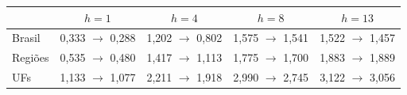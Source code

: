 \begin{tabular}{lcccc}
\toprule
 & $h=1$ & $h=4$ & $h=8$ & $h=13$ \\
\midrule
Brasil & 0,333 $\to$ 0,288 & 1,202 $\to$ 0,802 & 1,575 $\to$ 1,541 & 1,522 $\to$ 1,457 \\
Regiões & 0,535 $\to$ 0,480 & 1,417 $\to$ 1,113 & 1,775 $\to$ 1,700 & 1,883 $\to$ 1,889 \\
UFs & 1,133 $\to$ 1,077 & 2,211 $\to$ 1,918 & 2,990 $\to$ 2,745 & 3,122 $\to$ 3,056 \\
\bottomrule
\end{tabular}
